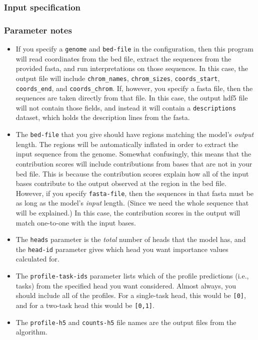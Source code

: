 \documentclass{article}
\begin{document}
\subsubsection{Input specification}



\subsubsection{Parameter notes}
\begin{itemize}
    \item If you specify a \texttt{genome} and \texttt{bed-file} in the
        configuration, then this program will read coordinates from the bed
        file, extract the sequences from the provided fasta, and run
        interpretations on those sequences.
        In this case, the output file will include \texttt{chrom\_names},
        \texttt{chrom\_sizes}, \texttt{coords\_start}, \texttt{coords\_end},
        and \texttt{coords\_chrom}.
        If, however, you specify a fasta file, then the sequences are taken
        directly from that file.
        In this case, the output hdf5 file will not contain those fields, and
        instead it will contain a \texttt{descriptions} dataset, which holds
        the description lines from the fasta.
    \item The \texttt{bed-file} that you give should have regions matching the
        model's \emph{output} length. The regions will be automatically inflated
        in order to extract the input sequence from the genome.
        Somewhat confusingly, this means that the contribution scores will
        include contributions from bases that are not in your bed file.
        This is because the contribution scores explain how all of the input
        bases contribute to the output observed at the region in the bed file.
        However, if you specify \texttt{fasta-file}, then the sequences in that
        fasta must be as long as the model's \emph{input} length.
        (Since we need the whole sequence that will be explained.)
        In this case, the contribution scores in the output will match
        one-to-one with the input bases.
    \item The \texttt{heads} parameter is the \emph{total} number of heads that
        the model has, and the \texttt{head-id} parameter gives which head you
        want importance values calculated for.
    \item The \texttt{profile-task-ids} parameter lists which of the profile
        predictions (i.e., tasks) from the specified head you want considered.
        Almost always, you should include all of the profiles.
        For a single-task head, this would be \texttt{[0]}, and for a two-task
        head this would be \texttt{[0,1]}.
    \item The \texttt{profile-h5} and \texttt{counts-h5} file names are the
        output files from the algorithm.
\end{itemize}
\end{document}
